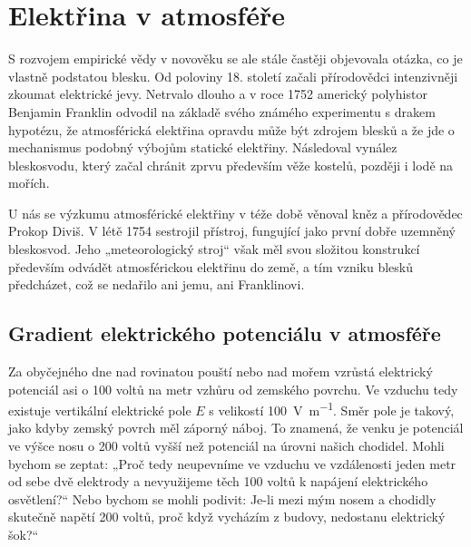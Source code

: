 \setchaptertoc
\chapter{Elektřina v atmosféře}\label{fyz:IIchapIX}  
  S rozvojem empirické vědy v novověku se ale stále častěji objevovala otázka, co je vlastně
  podstatou blesku. Od poloviny 18. století začali přírodovědci intenzivněji zkoumat elektrické
  jevy. Netrvalo dlouho a v roce 1752 americký polyhistor Benjamin Franklin odvodil na základě svého
  známého experimentu s drakem hypotézu, že atmosférická elektřina opravdu může být zdrojem blesků a
  že jde o mechanismus podobný výbojům statické elektřiny. Následoval vynález bleskosvodu, který
  začal chránit zprvu především věže kostelů, později i lodě na mořích.

  U nás se výzkumu atmosférické elektřiny v téže době věnoval kněz a přírodovědec Prokop Diviš. V
  létě 1754 sestrojil přístroj, fungující jako první dobře uzemněný bleskosvod. Jeho „meteorologický
  stroj“ však měl svou složitou konstrukcí především odvádět atmosférickou elektřinu do země, a tím
  vzniku blesků předcházet, což se nedařilo ani jemu, ani Franklinovi.

  \section{Gradient elektrického potenciálu v atmosféře}\label{fyz:IIchapIXsecI}  
    Za obyčejného dne nad rovinatou pouští nebo nad mořem vzrůstá elektrický potenciál asi o
    \num{100} voltů na metr vzhůru od zemského povrchu. Ve vzduchu tedy existuje vertikální
    elektrické pole \(E\) s velikostí \SI{100}{\V\per\m}. Směr pole je takový, jako kdyby zemský
    povrch měl záporný náboj. To znamená, že venku je potenciál ve výšce nosu o \num{200} voltů
    vyšší než potenciál na úrovni našich chodidel. Mohli bychom se zeptat: „Proč tedy neupevníme ve
    vzduchu ve vzdálenosti jeden metr od sebe dvě elektrody a nevyužijeme těch \num{100} voltů k
    napájení elektrického osvětlení?“ Nebo bychom se mohli podivit: Je-li mezi mým nosem a chodidly
    skutečně napětí 200 voltů, proč když vycházím z budovy, nedostanu elektrický šok?“

